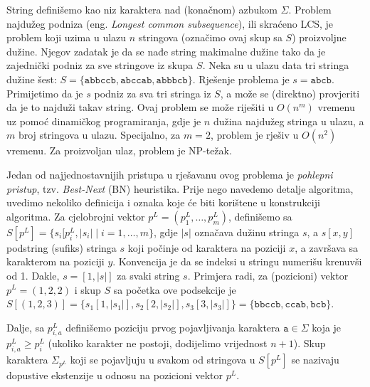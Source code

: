 \documentclass[a4paper, utf8, 11pt, colorlinks]{book}
\begin{document}
String definišemo kao niz karaktera nad (konačnom) azbukom $\Sigma$. 
Problem najdužeg podniza (eng. \emph{Longest common subsequence}), ili skraćeno LCS, je problem koji uzima u ulazu  $n$ stringova (označimo ovaj skup sa $S$) proizvoljne dužine. Njegov zadatak je da se nađe string makimalne dužine tako da je  zajednički podniz za sve stringove iz skupa $S$.  Neka su u ulazu data tri stringa dužine šest: $S = \{  \texttt{abbccb}, \texttt{abccab}, \texttt{abbbcb}   \}$. Rješenje problema je $s=\texttt{abcb}$. Primijetimo da je $s$ podniz za sva tri stringa iz $S$, a može se (direktno) provjeriti da je to najduži takav string. 
 Ovaj problem se može riješiti u $O(n^m)$ vremenu uz pomoć dinamičkog programiranja, gdje je $n$ dužina najdužeg stringa u ulazu, a $m$ broj stringova u ulazu. Specijalno, za  $m=2$, problem je rješiv u $O(n^2)$ vremenu. Za proizvoljan ulaz, problem je NP-težak.  


Jedan od najjednostavnijih pristupa u rješavanu ovog problema je  \emph{pohlepni pristup}, tzv. \emph{Best-Next} (BN) heuristika. Prije nego navedemo detalje algoritma, uvedimo nekoliko definicija i oznaka koje će biti korištene u konstrukciji algoritma. Za cjelobrojni vektor $p^L = (p^L_1,\ldots, p^L_m)$, definišemo sa
$S[p^L] = \{s_i[p^L_i, |s_i| \mid i=1,\ldots,m\}$, gdje $|s|$ označava dužinu stringa $s$, a $s[x,y]$ podstring (sufiks) stringa $s$ koji počinje od karaktera na poziciji $x$, a završava sa karakterom na poziciji $y$. Konvencija je da se indeksi u stringu numerišu krenuvši od 1. Dakle, $s= [1, |s|]$ za svaki string $s$. Primjera radi, za (pozicioni) vektor $p^L=(1,2,2)$ i skup $S$ sa početka ove podsekcije je $S[ (1,2,3)] = \{ s_1[1, |s_1|], s_2[2, |s_2|], s_3[3, |s_3|]  \}= \{ \texttt{bbccb}, \texttt{ccab}, \texttt{bcb}\}$. 
 
Dalje, sa $p^L_{i,a}$ definišemo poziciju prvog pojavljivanja karaktera $\texttt{a}\in \Sigma$ koja je  $p^L_{i,a} \geq p^L_i$ (ukoliko karakter ne postoji, dodijelimo vrijednost $n+1$). Skup karaktera $\Sigma_{p^L}$ koji se pojavljuju u svakom od stringova u $S[p^L]$ se nazivaju dopustive ekstenzije u odnosu na pozicioni vektor $p^L$. 
\end{document}
